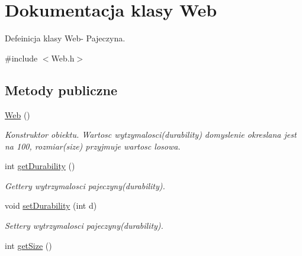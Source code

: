 \hypertarget{class_web}{}\section{Dokumentacja klasy Web}
\label{class_web}


Defeinicja klasy Web-\/ Pajeczyna.  




{\ttfamily \#include $<$Web.\+h$>$}

\subsection*{Metody publiczne}
\begin{DoxyCompactItemize}
\item 
\hyperlink{class_web_aa5e813821bc4a8e27b85e384298b3dcf}{Web} ()\hypertarget{class_web_aa5e813821bc4a8e27b85e384298b3dcf}{}\label{class_web_aa5e813821bc4a8e27b85e384298b3dcf}

\begin{DoxyCompactList}\small\item\em Konstruktor obiektu. Wartosc wytzymalosci(durability) domyslenie okreslana jest na 100, rozmiar(size) przyjmuje wartosc losowa. \end{DoxyCompactList}\item 
int \hyperlink{class_web_a8265f9537fba9a180d892e5015bbd6b4}{get\+Durability} ()\hypertarget{class_web_a8265f9537fba9a180d892e5015bbd6b4}{}\label{class_web_a8265f9537fba9a180d892e5015bbd6b4}

\begin{DoxyCompactList}\small\item\em Gettery wytrzymalosci pajeczyny(durability). \end{DoxyCompactList}\item 
void \hyperlink{class_web_a1daae9c11076a4a4c60714badb12975a}{set\+Durability} (int d)\hypertarget{class_web_a1daae9c11076a4a4c60714badb12975a}{}\label{class_web_a1daae9c11076a4a4c60714badb12975a}

\begin{DoxyCompactList}\small\item\em Settery wytrzymalosci pajeczyny(durability). \end{DoxyCompactList}\item 
int \hyperlink{class_web_a2403245f28543346130ab3d2d824d50e}{get\+Size} ()\hypertarget{class_web_a2403245f28543346130ab3d2d824d50e}{}\label{class_web_a2403245f28543346130ab3d2d824d50e}


\end{DoxyCompactItemize}
